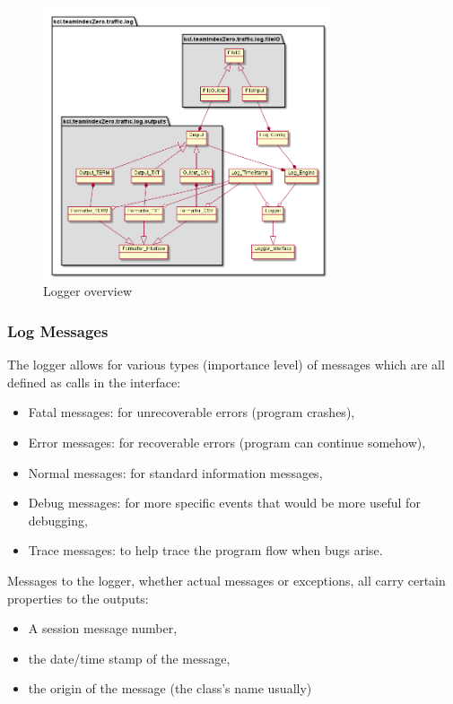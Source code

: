 \begin{figure}[!h]
	\vspace{1.5em}
  	\caption{Logger overview}
  	\label{fig:logger_overview}
  	\centering
	\includegraphics[width=0.75\textwidth]{figs/logger/LogModuleObjectDiagram.png}
  	\vspace{1.5em}
\end{figure}

\subsubsection{Log Messages}
The logger allows for various types (importance level) of messages which are all defined as calls in the interface:
\begin{itemize}
	\item Fatal messages: for unrecoverable errors (program crashes),
	\item Error messages: for recoverable errors (program can continue somehow),
	\item Normal messages: for standard information messages,
	\item Debug messages: for more specific events that would be more useful for debugging,
	\item Trace messages: to help trace the program flow when bugs arise.
\end{itemize}

Messages to the logger, whether actual messages or exceptions, all carry certain properties to the outputs:
\begin{itemize}
	\item A session message number,
	\item the date/time stamp of the message,
	\item the origin of the message (the class's name usually)
\end{itemize}

